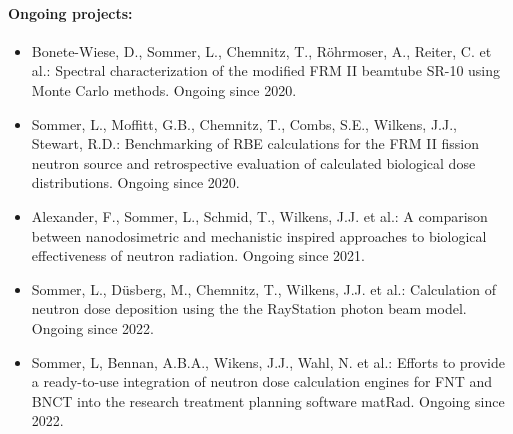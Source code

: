 \newpage

\paragraph{Ongoing projects:}
\begin{itemize}
    \item Bonete-Wiese, D., Sommer, L., Chemnitz, T., R\"ohrmoser, A., Reiter, C. et al.: Spectral characterization of the modified FRM II beamtube SR-10 using Monte Carlo methods. Ongoing since 2020.
    \item Sommer, L., Moffitt, G.B., Chemnitz, T., Combs, S.E., Wilkens, J.J., Stewart, R.D.: Benchmarking of RBE calculations for the FRM II fission neutron source and retrospective evaluation of calculated biological dose distributions. Ongoing since 2020.
    \item Alexander, F., Sommer, L., Schmid, T., Wilkens, J.J. et al.: A comparison between nanodosimetric and mechanistic inspired approaches to biological effectiveness of neutron radiation. Ongoing since 2021.
    \item Sommer, L., D\"usberg, M., Chemnitz, T., Wilkens, J.J. et al.: Calculation of neutron dose deposition using the the RayStation photon beam model. Ongoing since 2022.
    \item Sommer, L, Bennan, A.B.A., Wikens, J.J., Wahl, N. et al.: Efforts to provide a ready-to-use integration of neutron dose calculation engines for FNT and BNCT into the research treatment planning software matRad. Ongoing since 2022.
\end{itemize}